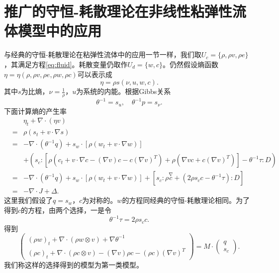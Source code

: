\documentclass{article}
\begin{document}
\section{推广的守恒-耗散理论在非线性粘弹性流体模型中的应用}
与经典的守恒-耗散理论在粘弹性流体中的应用一节一样，我们取$U_c = \{ \rho,\rho v,\rho e\}$，其满足方程\eqref{eq:fluid}。耗散变量仍取作$U_d =\{ w,c\}$。仍然假设熵函数$\eta =\eta(\rho,\rho v,\rho e,\rho w,\rho c)$可以表示成
\begin{equation*}
	\eta = \rho s(\nu,u,w,c).
\end{equation*}
其中$s$为比熵，$\nu = \frac{1}{\rho}$，$u$为系统的内能。根据Gibbs关系
\begin{equation*}
		\theta^{-1} = s_u, \quad \theta^{-1} p = s_{\nu}.
\end{equation*}
下面计算熵的产生率
\begin{eqnarray*}
		&&\eta_t + \nabla \cdot (\eta v) \\
		&=& \rho (s_t + v \cdot \nabla s) \\
		&=& -\nabla \cdot (\theta^{-1} q) + s_w \cdot [\rho (w_t + v \cdot \nabla w)] \\
		&&+ (s_c:[\rho (c_t + v \cdot \nabla c - (\nabla v) c - c (\nabla v)^T) + \rho (\nabla v c + c (\nabla v)^T)] - \theta^{-1} \tau : D) \\
		&=& -\nabla \cdot (\theta^{-1} q) + s_w \cdot [\rho (w_t + v \cdot \nabla w)] + [s_c:\rho \stackrel{\nabla}{c} + (2 \rho s_c c - \theta^{-1} \tau): D]   \\
		&=& -\nabla \cdot J + \Delta.
	\end{eqnarray*}	
	这里我们假设了$q=s_w$，$c$为对称的。$w$的方程同经典的守恒-耗散理论相同。为了得到$c$的方程，由两个选择，一是令
	\begin{equation*}
		\theta^{-1} \tau = 2 \rho s_c c.
	\end{equation*}
	得到
	\begin{equation} \label{eq:ECDFgeneral1}
		\left( \begin{array}{c} 
			(\rho w)_t +  \nabla \cdot (\rho w \otimes v)  + \nabla \theta^{-1} \\
			(\rho c)_t +  \nabla \cdot (\rho c \otimes v) - (\nabla v) \rho c - (\rho c) (\nabla v)^T 
		\end{array} \right) = M \cdot
		\left( \begin{array}{c} 
			q \\ s_c
		\end{array}\right).
	\end{equation}
	我们称这样的选择得到的模型为第一类模型。
\end{document}
